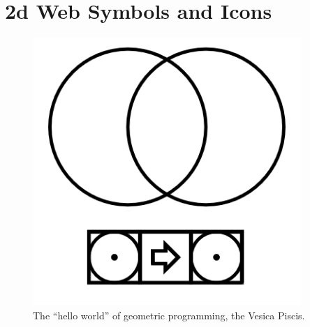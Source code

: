 \section{2d Web Symbols and Icons}


\begin{figure}
	\centering
	\includegraphics[width=4in]{figures/web2d/vesicapiscis.png}
	\caption[vesicapiscis]
	{The ``hello world'' of geometric programming, the Vesica Piscis.}
\end{figure}


